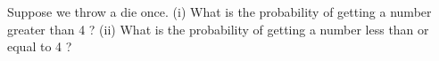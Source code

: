 Suppose we throw a die once. (i) What is the probability of getting a number greater than 4 ? (ii) What is the probability of getting a number less than or
equal to 4 ?
